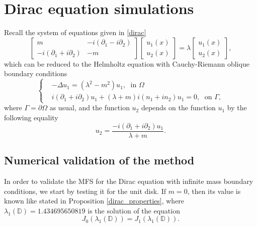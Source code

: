 \label{chap:implement}

\section{Dirac equation simulations}\label{dirac_equation_simulations}

Recall the system of equations given in \eqref{dirac}
\begin{equation}
    \begin{bmatrix}
        m & -i(\partial_1 - i \partial_2)\\
        -i(\partial_1 + i \partial_2) & -m
    \end{bmatrix}
    \begin{bmatrix}
        u_1(x)\\
        u_2(x)
    \end{bmatrix}
    =\lambda
    \begin{bmatrix}
    u_1(x)\\
    u_2(x)
    \end{bmatrix},
\end{equation}
which can be reduced to the Helmholtz equation with Cauchy-Riemann oblique boundary conditions
\begin{equation*}
    \begin{cases}
        &-\Delta u_1 = (\lambda^2 - m^2)u_1, \; \text{ in } \Omega\\
        & i (\partial_1 + i\partial_2)u_1 + (\lambda + m)i(n_1 + i n_2)u_1 = 0, \; \text{ on } \Gamma,
    \end{cases}      
\end{equation*}
where \(\Gamma = \partial\Omega\) as usual, and the function \(u_2\) depends on the function \(u_1\) by the following equality
\[
    u_2 = \frac{-i (\partial_1 + i\partial_2)u_1}{\lambda + m}.    
\]
\subsection{Numerical validation of the method}

In order to validate the MFS for the Dirac equation with infinite mass boundary conditions, we start by testing it for the unit disk. If \(m=0\), then its value is known like stated in Proposition \ref{dirac_properties}, where \(\lambda_1(\mathbb{D})= 1.434695650819\) is the solution of the equation
\[
    J_0(\lambda_1(\mathbb{D})) = J_1(\lambda_1(\mathbb{D})).
\]

